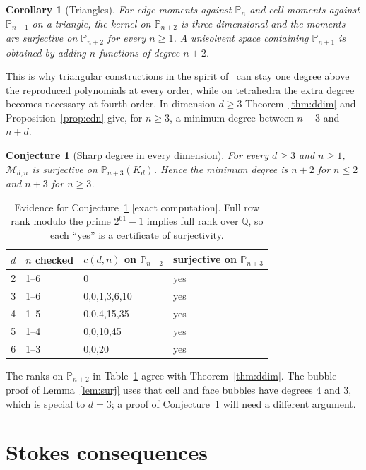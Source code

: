 \documentclass[11pt,a4paper]{article}
\newtheorem{corollary}[theorem]{Corollary}
\newtheorem{conjecture}[theorem]{Conjecture}
\theoremstyle{definition}
\theoremstyle{remark}
\newcommand{\M}{\mathcal M}
\newcommand{\evid}[1]{\textsf{[#1]}}
\newcommand{\Pol}{\mathbb P}
\begin{document}
\begin{corollary}[Triangles]
\label{cor:2d}
For edge moments against \(\Pol_n\) and cell moments against \(\Pol_{n-1}\) on a
triangle, the kernel on \(\Pol_{n+2}\) is three-dimensional and the moments are
surjective on \(\Pol_{n+2}\) for every \(n\ge1\). A unisolvent space containing
\(\Pol_{n+1}\) is obtained by adding \(n\) functions of degree \(n+2\).
\end{corollary}

This is why triangular constructions in the spirit of~\cite{FS1983,MT2005,BS2007}
can stay one degree above the reproduced polynomials at every order, while on
tetrahedra the extra degree becomes necessary at fourth order. In dimension
\(d\ge3\) Theorem~\ref{thm:ddim} and Proposition~\ref{prop:cdn} give, for
\(n\ge3\), a minimum degree between \(n+3\) and \(n+d\).

\begin{conjecture}[Sharp degree in every dimension]
\label{conj:ddim}
For every \(d\ge3\) and \(n\ge1\), \(\M_{d,n}\) is surjective on \(\Pol_{n+3}(K_d)\).
Hence the minimum degree is \(n+2\) for \(n\le2\) and \(n+3\) for \(n\ge3\).
\end{conjecture}

\begin{table}[ht]
\centering
\caption{Evidence for Conjecture~\ref{conj:ddim} \evid{exact computation}.
Full row rank modulo the prime \(2^{61}-1\) implies full rank over
\(\mathbb Q\), so each ``yes'' is a certificate of surjectivity.}
\label{tab:ddim}
\begin{tabular}{rlll}
\toprule
\(d\)&\(n\) checked&\(c(d,n)\) on \(\Pol_{n+2}\)&surjective on \(\Pol_{n+3}\)\\
\midrule
2&1--6&0&yes\\
3&1--6&0,0,1,3,6,10&yes\\
4&1--5&0,0,4,15,35&yes\\
5&1--4&0,0,10,45&yes\\
6&1--3&0,0,20&yes\\
\bottomrule
\end{tabular}
\end{table}

The ranks on \(\Pol_{n+2}\) in Table~\ref{tab:ddim} agree with
Theorem~\ref{thm:ddim}. The bubble proof of Lemma~\ref{lem:surj} uses that cell
and face bubbles have degrees \(4\) and \(3\), which is special to \(d=3\); a
proof of Conjecture~\ref{conj:ddim} will need a different argument.

\section{Stokes consequences}
\label{sec:stokes}
\end{document}
